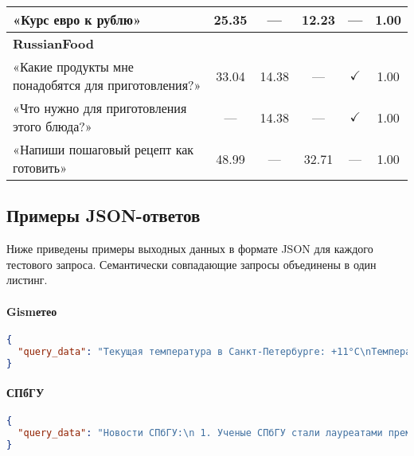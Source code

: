 \begin{sidewaystable}
\begin{tabular}{p{5cm} c c c c c}
        «Курс евро к рублю»                                & 25.35  & —     & 12.23 & —             & 1.00 \\
        \midrule
        \textbf{RussianFood} & & & & & \\
        «Какие продукты мне понадобятся для приготовления?» & 33.04  & 14.38 & —    & $\checkmark$   & 1.00 \\
        «Что нужно для приготовления этого блюда?»         & —      & 14.38 & —    & $\checkmark$   & 1.00 \\
        «Напиши пошаговый рецепт как готовить»             & 48.99  & —     & 32.71 & —             & 1.00 \\
        \bottomrule
    \end{tabular}
    \label{tab:times}
\end{sidewaystable}

\subsection{Примеры JSON-ответов}

Ниже приведены примеры выходных данных в формате JSON для каждого тестового запроса. Семантически совпадающие запросы объединены в один листинг.

\paragraph{Gismетео}
\begin{lstlisting}[language=json,breaklines,keepspaces]
{
  "query_data": "Текущая температура в Санкт-Петербурге: +11°C\nТемпература по ощущению: +10°C\n"
}
\end{lstlisting}

\paragraph{СПбГУ}
\begin{lstlisting}[language=json,breaklines,keepspaces]
{
  "query_data": "Новости СПбГУ:\n 1. Ученые СПбГУ стали лауреатами премии правительства Санкт-Петербурга\n  Дата: 30 мая 2025\n  Ссылка: /news-events/novosti/uchenye-spbgu-stali-laureatami-premii-pravitelstva-sankt-peterburga-0\n\n2. К юбилею почетного профессора СПбГУ Игоря Васильевича Мурина\n  Дата: 29 мая 2025\n  Ссылка: /news-events/novosti/k-yubileyu-pochetnogo-professora-spbgu-igorya-vasilevicha-murina\n\n3. Модельный закон, подготовленный при участии юристов СПбГУ, одобрен Межпарламентской ассамблеей СНГ\n  Дата: 27 мая 2025\n  Ссылка: /news-events/novosti/modelnyy-zakon-podgotovlennyy-pri-uchastii-yuristov-spbgu-odobren\n\n4. Материалы ректорского совещания от 5 мая\n  Дата: 5 мая 2025\n  Ссылка: /news-events/novosti/materialy-rektorskogo-soveschaniya-ot-5-maya\n\n"
}
\end{lstlisting}


